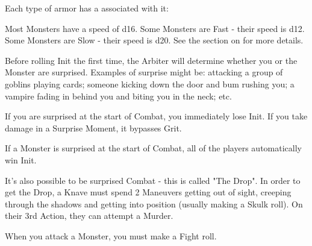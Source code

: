 {  


  Each type of armor has a \MD associated with it:



  Most Monsters have a speed of d16.  Some Monsters are Fast - their speed is d12.  Some Monsters are Slow - their speed is d20.  See the section on  for more details.



  Before rolling Init the first time, the Arbiter will determine whether you or the Monster are surprised. Examples of surprise might be: attacking a group of goblins playing cards; someone kicking down the door and bum rushing you; a vampire fading in behind you and biting you in the neck; etc.

  If you are surprised at the start of Combat, you immediately lose Init. If you take damage in a Surprise Moment, it bypasses Grit.

  If a Monster is surprised at the start of Combat, all of the players automatically win Init.

  It's also possible to be surprised  Combat - this is called "The Drop".  In order to get the Drop, a Knave must spend 2 Maneuvers getting out of sight, creeping through the shadows and getting into position (usually making a Skulk roll).  On their 3rd Action, they can attempt a Murder.

  



  When you attack a Monster, you must make a Fight roll.


}
